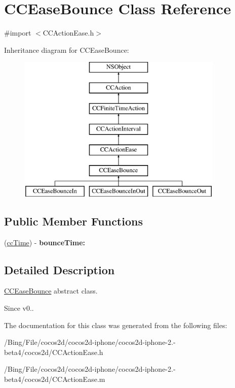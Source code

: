 \hypertarget{interface_c_c_ease_bounce}{\section{C\-C\-Ease\-Bounce Class Reference}
\label{interface_c_c_ease_bounce}
}


{\ttfamily \#import $<$C\-C\-Action\-Ease.\-h$>$}

Inheritance diagram for C\-C\-Ease\-Bounce\-:\begin{figure}[H]
\begin{center}
\leavevmode
\includegraphics[height=7.000000cm]{interface_c_c_ease_bounce}
\end{center}
\end{figure}
\subsection*{Public Member Functions}
\begin{DoxyCompactItemize}
\item 
\hypertarget{interface_c_c_ease_bounce_ad96554827beda8d69c922cf5508b2e01}{(\hyperlink{cc_types_8h_ae6c674aac4bfb46a4e6cb1e89bb66b4f}{cc\-Time}) -\/ {\bfseries bounce\-Time\-:}}\label{interface_c_c_ease_bounce_ad96554827beda8d69c922cf5508b2e01}

\end{DoxyCompactItemize}


\subsection{Detailed Description}
\hyperlink{interface_c_c_ease_bounce}{C\-C\-Ease\-Bounce} abstract class. \begin{DoxySince}{Since}
v0.. 
\end{DoxySince}


The documentation for this class was generated from the following files\-:\begin{DoxyCompactItemize}
\item 
/\-Bing/\-File/cocos2d/cocos2d-\/iphone/cocos2d-\/iphone-\/2.-\/beta4/cocos2d/C\-C\-Action\-Ease.\-h\item 
/\-Bing/\-File/cocos2d/cocos2d-\/iphone/cocos2d-\/iphone-\/2.-\/beta4/cocos2d/C\-C\-Action\-Ease.\-m\end{DoxyCompactItemize}

